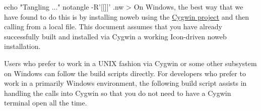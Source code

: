 \documentclass{article}%
\begin{document}
echo "Tangling ..."
notangle -R'[[]]' .nw > 
\eatline
\nwnotused{[[TANGLE.sh]]}\nwendcode{}\nwdocspar
On Windows, the best way that we have found to do this is
by installing noweb using the
\href{https://www.cygwin.com/}{Cygwin project}
and then calling {\Tt{}\nwendquote} from a local {\Tt{}\nwendquote} file.
This document assumes that you have already successfully built and
installed via Cygwin a working Icon-driven noweb installation.

Users who prefer to work in a UNIX fashion via Cygwin or some other
subsystem on Windows can follow the build scripts directly.
For developers who prefer to work in a primarily Windows environment,
the following {\Tt{}\nwendquote} build script assists 
in handling the calls into Cygwin
so that you do not need to have a Cygwin terminal open all the time.
\end{document}
